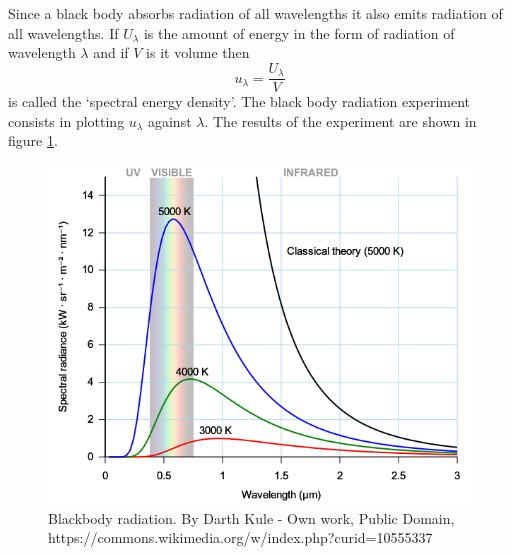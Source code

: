 Since a black body absorbs radiation of all wavelengths it also emits radiation
of all wavelengths. If $U_\lambda$ is the amount of energy in the form of 
radiation of wavelength $\lambda$ and if $V$ is it volume then 
\begin{equation}\label{c2s1e1}
u_\lambda = \frac{U_\lambda}{V}
\end{equation}
is called the `spectral energy density'. The black body radiation experiment
consists in plotting $u_\lambda$ against $\lambda$. The results of the 
experiment are shown in figure \ref{c2f1}. 
\begin{figure}
\includegraphics[scale=0.5]{Black_body}
\caption{Blackbody radiation. By Darth Kule - Own work, Public Domain, 
https://commons.wikimedia.org/w/index.php?curid=10555337}
\label{c2f1}
\end{figure}

